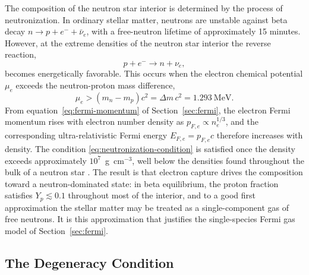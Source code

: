 The composition of the neutron star interior is determined by the process
of neutronization. In ordinary stellar matter, neutrons are unstable against beta
decay $n \rightarrow p + e^- + \bar{\nu}_e$, with a free-neutron lifetime
of approximately 15 minutes. However, at the extreme densities of the
neutron star interior the reverse reaction,
%
\begin{equation}
    p + e^- \rightarrow n + \nu_e,
    \label{eq:neutronization}
\end{equation}
%
becomes energetically favorable. This occurs when the electron chemical
potential $\mu_e$ exceeds the neutron-proton mass difference,
%
\begin{equation}
    \mu_e > (m_n - m_p)c^2 = \Delta m\, c^2 = 1.293~\text{MeV}.
    \label{eq:neutronization-condition}
\end{equation}
%
From equation~\eqref{eq:fermi-momentum} of Section~\ref{sec:fermi}, the
electron Fermi momentum rises with electron number density as
$p_{F,e} \propto n_e^{1/3}$, and the corresponding ultra-relativistic
Fermi energy $E_{F,e} = p_{F,e}c$ therefore increases with density.
The condition \eqref{eq:neutronization-condition} is satisfied once the
density exceeds approximately $10^7$~g~cm$^{-3}$, well below the
densities found throughout the bulk of a neutron star
\cite{shapiro_teukolsky_1983}. The result is that electron capture drives the
composition toward a neutron-dominated state: in beta equilibrium, the
proton fraction satisfies $Y_p \lesssim 0.1$ throughout most of the
interior, and to a good first approximation the stellar matter may be
treated as a single-component gas of free neutrons. It is this
approximation that justifies the single-species Fermi gas model of
Section~\ref{sec:fermi}.
 
\subsection{The Degeneracy Condition}
 
